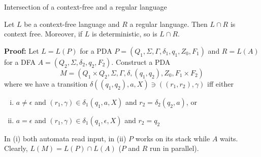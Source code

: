 \documentclass[handout]{beamer}
\begin{document}
\begin{frame}{Intersection of a context-free and a regular language}

    \begin{theorem}
        Let $L$ be a context-free language and $R$ a regular language. Then $L\cap R$ is context free. Moreover, if $L$ is deterministic, so is $L\cap R$.
    \end{theorem}

    \textbf{Proof:} Let $L=L(P)$ for a PDA $P=(Q_1,\Sigma,\Gamma,\delta_1,q_1,Z_0,F_1)$ and $R=L(A)$ for a DFA $A=(Q_2,\Sigma,\delta_2,q_2,F_2)$. Construct a PDA 
    $$
    M=(Q_1\times Q_2,\Sigma,\Gamma,\delta, (q_1,q_2),Z_0,F_1\times F_2)
    $$ 
    where we have a transition $\delta((q_1,q_2),a,X)\ni((r_1,r_2),\gamma)$ iff either
    \begin{enumerate}[(i)]
        \item $a\neq\epsilon$ and $(r_1,\gamma)\in \delta_1(q_1,a,X)$ and $r_2=\delta_2(q_2,a)$, or
        \item $a=\epsilon$ and $(r_1,\gamma)\in \delta_1(q_1,\epsilon,X)$ and $r_2=q_2$
    \end{enumerate}
    In (i) both automata read input, in (ii) $P$ works on its stack while $A$ waits. Clearly, $L(M)=L(P)\cap L(A)$ ($P$ and $R$ run in parallel).\hfill\qedsymbol       

\end{frame}
\end{document}
